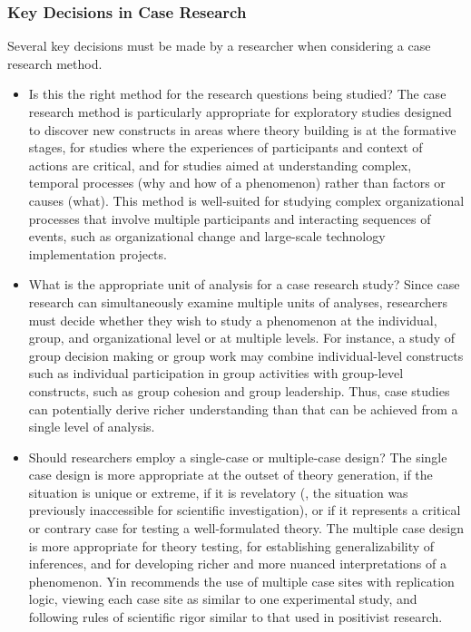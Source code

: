 \subsubsection{Key Decisions in Case Research}

Several key decisions must be made by a researcher when considering a case research method. 

\begin{itemize}
	\item Is this the right method for the research questions being studied? The case research method is particularly appropriate for exploratory studies designed to discover new constructs in areas where theory building is at the formative stages, for studies where the experiences of participants and context of actions are critical, and for studies aimed at understanding complex, temporal processes (why and how of a phenomenon) rather than factors or causes (what). This method is well-suited for studying complex organizational processes that involve multiple participants and interacting sequences of events, such as organizational change and large-scale technology implementation projects.

	\item What is the appropriate unit of analysis for a case research study? Since case research can simultaneously examine multiple units of analyses, researchers must decide whether they wish to study a phenomenon at the individual, group, and organizational level or at multiple levels. For instance, a study of group decision making or group work may combine individual-level constructs such as individual participation in group activities with group-level constructs, such as group cohesion and group leadership. Thus, case studies can potentially derive richer understanding than that can be achieved from a single level of analysis.

	\item Should researchers employ a single-case or multiple-case design? The single case design is more appropriate at the outset of theory generation, if the situation is unique or extreme, if it is revelatory (\ie, the situation was previously inaccessible for scientific investigation), or if it represents a critical or contrary case for testing a well-formulated theory. The multiple case design is more appropriate for theory testing, for establishing generalizability of inferences, and for developing richer and more nuanced interpretations of a phenomenon. Yin\cite{yin2017case} recommends the use of multiple case sites with replication logic, viewing each case site as similar to one experimental study, and following rules of scientific rigor similar to that used in positivist research.


\end{itemize}
